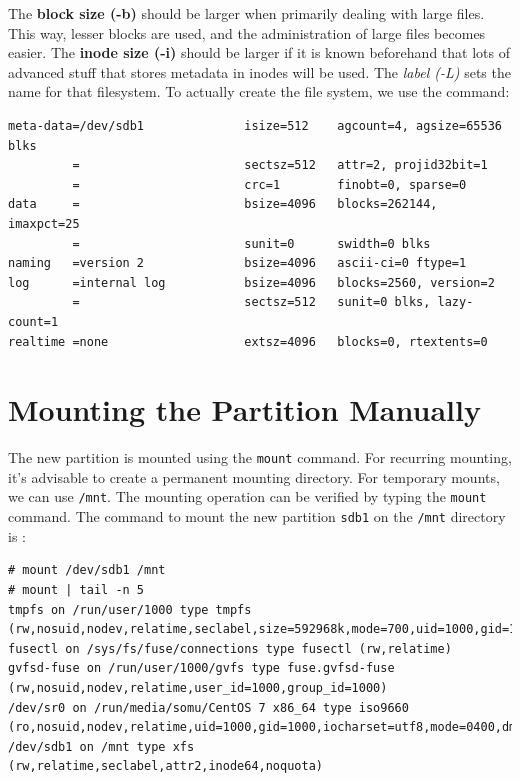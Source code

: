 \noindent
The \textbf{block size (-b)} should be larger when primarily dealing with large files. This way, lesser blocks are used, and the administration of large files becomes easier. The \textbf{inode size (-i)} should be larger if it is known beforehand that lots of advanced stuff that stores metadata in inodes will be used. The \textit{label (-L)} sets the name for that filesystem. To actually create the file system, we use the command:

\vspace{-15pt}
\begin{verbatim}
meta-data=/dev/sdb1              isize=512    agcount=4, agsize=65536 blks
         =                       sectsz=512   attr=2, projid32bit=1
         =                       crc=1        finobt=0, sparse=0
data     =                       bsize=4096   blocks=262144, imaxpct=25
         =                       sunit=0      swidth=0 blks
naming   =version 2              bsize=4096   ascii-ci=0 ftype=1
log      =internal log           bsize=4096   blocks=2560, version=2
         =                       sectsz=512   sunit=0 blks, lazy-count=1
realtime =none                   extsz=4096   blocks=0, rtextents=0
\end{verbatim}
\vspace{-10pt}

	\section{Mounting the Partition Manually}
The new partition is mounted using the \verb|mount| command. For recurring mounting, it's advisable to create a permanent mounting directory. For temporary mounts, we can use \verb|/mnt|. The mounting operation can be verified by typing the \verb|mount| command. The command to mount the new partition \verb|sdb1| on the \verb|/mnt| directory is :

\vspace{-15pt}
\begin{verbatim}
# mount /dev/sdb1 /mnt
# mount | tail -n 5
tmpfs on /run/user/1000 type tmpfs (rw,nosuid,nodev,relatime,seclabel,size=592968k,mode=700,uid=1000,gid=1000)
fusectl on /sys/fs/fuse/connections type fusectl (rw,relatime)
gvfsd-fuse on /run/user/1000/gvfs type fuse.gvfsd-fuse (rw,nosuid,nodev,relatime,user_id=1000,group_id=1000)
/dev/sr0 on /run/media/somu/CentOS 7 x86_64 type iso9660 (ro,nosuid,nodev,relatime,uid=1000,gid=1000,iocharset=utf8,mode=0400,dmode=0500,uhelper=udisks2)
/dev/sdb1 on /mnt type xfs (rw,relatime,seclabel,attr2,inode64,noquota)
\end{verbatim}
\vspace{-10pt}

